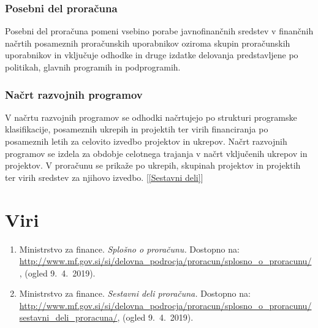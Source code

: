 \documentclass[12pt, a4paper]{article}
\begin{document}
\subsubsection[Posebni del proračuna]{Posebni del proračuna}
Posebni del proračuna pomeni vsebino porabe javnofinančnih sredstev v finančnih načrtih posameznih proračunskih uporabnikov oziroma skupin proračunskih uporabnikov in vključuje odhodke in druge izdatke delovanja predstavljene po politikah, glavnih programih in podprogramih. 

\subsubsection[Načrt razvojnih programov]{Načrt razvojnih programov}
V načrtu razvojnih programov se odhodki načrtujejo po strukturi programske klasifikacije, posameznih ukrepih in projektih ter virih financiranja po posameznih letih za celovito izvedbo projektov in ukrepov. Načrt razvojnih programov se izdela za obdobje celotnega trajanja v načrt vključenih ukrepov in projektov. V proračunu se prikaže po ukrepih, skupinah projektov in projektih ter virih sredstev za njihovo izvedbo. [\ref{Sestavni deli}]

\newpage

\section[Viri]{Viri}
\begin{enumerate}
\item
\label{Splošno o proračunu}
Ministrstvo za finance. \emph{Splošno o proračunu.} Dostopno na: \url{http://www.mf.gov.si/si/delovna_podrocja/proracun/splosno_o_proracunu/},  (ogled 9.~4.~2019).

\item
\label{Sestavni deli}
Ministrstvo za finance. \emph{Sestavni deli proračuna.} Dostopno na: \url{http://www.mf.gov.si/si/delovna_podrocja/proracun/splosno_o_proracunu/sestavni_deli_proracuna/}, (ogled 9.~4.~2019).
\end{enumerate}
\end{document}
